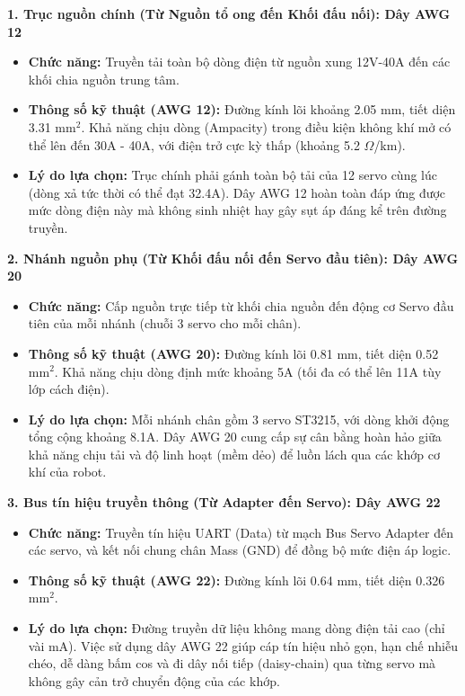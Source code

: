 \textbf{1. Trục nguồn chính (Từ Nguồn tổ ong đến Khối đấu nối): Dây AWG 12}
\begin{itemize}
    \item \textbf{Chức năng:} Truyền tải toàn bộ dòng điện từ nguồn xung 12V-40A đến các khối chia nguồn trung tâm.
    \item \textbf{Thông số kỹ thuật (AWG 12):} Đường kính lõi khoảng 2.05 mm, tiết diện 3.31 mm$^2$. Khả năng chịu dòng (Ampacity) trong điều kiện không khí mở có thể lên đến 30A - 40A, với điện trở cực kỳ thấp (khoảng 5.2 $\Omega$/km).
    \item \textbf{Lý do lựa chọn:} Trục chính phải gánh toàn bộ tải của 12 servo cùng lúc (dòng xả tức thời có thể đạt 32.4A). Dây AWG 12 hoàn toàn đáp ứng được mức dòng điện này mà không sinh nhiệt hay gây sụt áp đáng kể trên đường truyền.
\end{itemize}

\textbf{2. Nhánh nguồn phụ (Từ Khối đấu nối đến Servo đầu tiên): Dây AWG 20}
\begin{itemize}
    \item \textbf{Chức năng:} Cấp nguồn trực tiếp từ khối chia nguồn đến động cơ Servo đầu tiên của mỗi nhánh (chuỗi 3 servo cho mỗi chân).
    \item \textbf{Thông số kỹ thuật (AWG 20):} Đường kính lõi 0.81 mm, tiết diện 0.52 mm$^2$. Khả năng chịu dòng định mức khoảng 5A (tối đa có thể lên 11A tùy lớp cách điện).
    \item \textbf{Lý do lựa chọn:} Mỗi nhánh chân gồm 3 servo ST3215, với dòng khởi động tổng cộng khoảng 8.1A. Dây AWG 20 cung cấp sự cân bằng hoàn hảo giữa khả năng chịu tải và độ linh hoạt (mềm dẻo) để luồn lách qua các khớp cơ khí của robot.
\end{itemize}

\textbf{3. Bus tín hiệu truyền thông (Từ Adapter đến Servo): Dây AWG 22}
\begin{itemize}
    \item \textbf{Chức năng:} Truyền tín hiệu UART (Data) từ mạch Bus Servo Adapter đến các servo, và kết nối chung chân Mass (GND) để đồng bộ mức điện áp logic.
    \item \textbf{Thông số kỹ thuật (AWG 22):} Đường kính lõi 0.64 mm, tiết diện 0.326 mm$^2$. 
    \item \textbf{Lý do lựa chọn:} Đường truyền dữ liệu không mang dòng điện tải cao (chỉ vài mA). Việc sử dụng dây AWG 22 giúp cáp tín hiệu nhỏ gọn, hạn chế nhiễu chéo, dễ dàng bấm cos và đi dây nối tiếp (daisy-chain) qua từng servo mà không gây cản trở chuyển động của các khớp.
\end{itemize}

